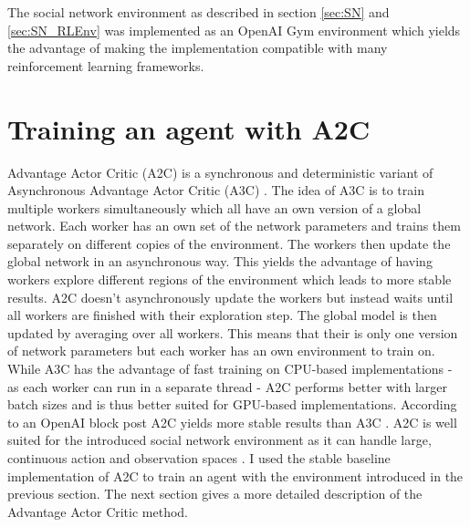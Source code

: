 \documentclass[11pt, a4paper]{article}
\begin{document}
The social network environment as described in section \ref{sec:SN} and \ref{sec:SN_RLEnv} was implemented as an OpenAI Gym \cite{gym} environment which yields the advantage of making the implementation compatible with many reinforcement learning frameworks.

\section{Training an agent with A2C} \label{sec:A2C}
Advantage Actor Critic (A2C) \cite{A2C_1} is a synchronous and deterministic variant of Asynchronous Advantage Actor Critic (A3C) \cite{A3C_1,A3C_2}. The idea of A3C is to train multiple workers simultaneously which all have an own version of a global network. Each worker has an own set of the network parameters and trains them separately on different copies of the environment. The workers then update the global network in an asynchronous way. This yields the advantage of having workers explore different regions of the environment which leads to more stable results. A2C doesn't asynchronously update the workers but instead waits until all workers are finished with their exploration step. The global model is then updated by averaging over all workers. This means that their is only one version of network parameters but each worker has an own environment to train on. While A3C has the advantage of fast training on CPU-based implementations \cite{A3C_1} - as each worker can run in a separate thread - A2C performs better with larger batch sizes and is thus better suited for GPU-based implementations. According to an OpenAI block post A2C yields more stable results than A3C \cite{A2C_3}. A2C is well suited for the introduced social network environment as it can handle large, continuous action and observation spaces \cite{A2C_1}. I used the stable baseline \cite{stable-baselines} implementation of A2C to train an agent with the environment introduced in the previous section. \newline
The next section gives a more detailed description of the Advantage Actor Critic method.
\end{document}

